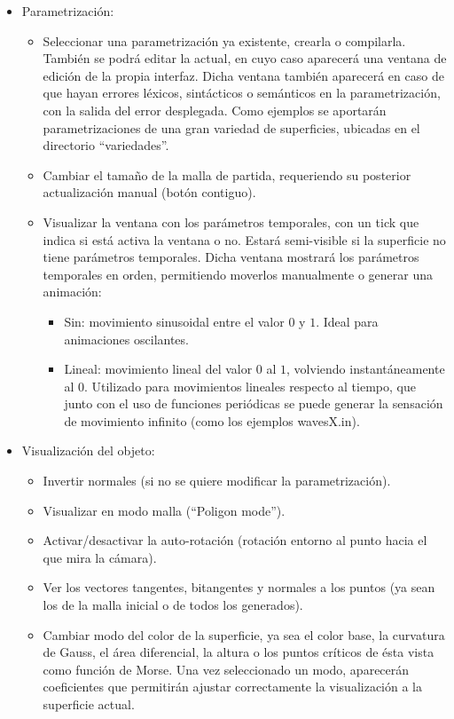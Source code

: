 \begin{itemize}
	\item Parametrización:
	\begin{itemize}
		\item Seleccionar una parametrización ya existente, crearla o compilarla. También se podrá editar la actual, en cuyo caso aparecerá una ventana de edición de la propia interfaz. Dicha ventana también aparecerá en caso de que hayan errores léxicos, sintácticos o semánticos en la parametrización, con la salida del error desplegada. Como ejemplos se aportarán parametrizaciones de una gran variedad de superficies, ubicadas en el directorio ``variedades''.
		\item Cambiar el tamaño de la malla de partida, requeriendo su posterior actualización manual (botón contiguo).
		\item Visualizar la ventana con los parámetros temporales, con un tick que indica si está activa la ventana o no. Estará semi-visible si la superficie no tiene parámetros temporales. Dicha ventana mostrará los parámetros temporales en orden, permitiendo moverlos manualmente o generar una animación:
		\begin{itemize}
			\item Sin: movimiento sinusoidal entre el valor $0$ y $1$. Ideal para animaciones oscilantes.
			\item Lineal: movimiento lineal del valor $0$ al $1$, volviendo instantáneamente al $0$. Utilizado para movimientos lineales respecto al tiempo, que junto con el uso de funciones periódicas se puede generar la sensación de movimiento infinito (como los ejemplos wavesX.in).
		\end{itemize}
	\end{itemize}
	\item Visualización del objeto:
	\begin{itemize}
		\item Invertir normales (si no se quiere modificar la parametrización).
		\item Visualizar en modo malla (``Poligon mode'').
		\item Activar/desactivar la auto-rotación (rotación entorno al punto hacia el que mira la cámara).
		\item Ver los vectores tangentes, bitangentes y normales a los puntos (ya sean los de la malla inicial o de todos los generados).
		\item Cambiar modo del color de la superficie, ya sea el color base, la curvatura de Gauss, el área diferencial, la altura o los puntos críticos de ésta vista como función de Morse. Una vez seleccionado un modo, aparecerán coeficientes que permitirán ajustar correctamente la visualización a la superficie actual.

\end{itemize}
\end{itemize}
